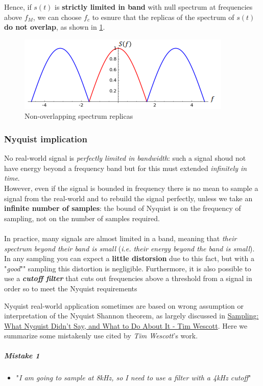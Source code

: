 \documentclass[10pt,a4paper]{report}
\theoremstyle{definition}
\begin{document}
Hence, if $s(t)$ is \textbf{strictly limited in band} with null spectrum at frequencies above $f_{M}$, we can choose $f_{c}$ to esnure that the replicas of the spectrum of $s(t)$ \textbf{do not overlap}, as shown in \ref{non-overlap-spectrum}.
\begin{figure}[h!]
	\centering\includegraphics[scale=0.50]{images/Pasted image 20230526120312.png}
	\caption{Non-overlapping spectrum replicas}
	\label{non-overlap-spectrum}
\end{figure}

\subsubsection{Nyquist implication}\label{sec:nyquist-implication}
No real-world signal is \textit{perfectly limited in bandwidth}: such a signal shoud not have energy beyond a frequency band but for this must extended \textit{infinitely in time}.\\
However, even if the signal is bounded in frequency there is no mean to sample a signal from the real-world and to rebuild the signal perfectly, unless we take an \textbf{infinite number of samples}: the bound of Nyquist is on the frequency of sampling, not on the number of samples required.\\\\
In practice, many signals are almost limited in a band, meaning that \textit{their spectrum beyond their band is small} (\textit{i.e. their energy beyond the band is small}).
In any sampling you can expect a \textbf{little distorsion} due to this fact,  but with a "\textit{good}"" sampling this distortion is negligible.
Furthermore, it is also possible to use a \textit{\textbf{cutoff filter}} that cuts out frequencies above a threshold from a signal in order so to meet the Nyquist requirements

Nyquist real-world application sometimes are based on wrong assumption or interpretation of the Nyquist Shannon theorem, as largely discussed in \href{https://neuron.eng.wayne.edu/auth/ece4330/practical_sampling.pdf}{Sampling: What Nyquist Didn’t Say, and What to Do About It -  Tim Wescott}.
Here we summarize some mistakenly use cited by \textit{Tim Wescott}'s work.
\subparagraph{Mistake 1}\label{sec:mistake-1}
\begin{itemize}
	\item "\textit{I am going to sample at 8kHz, so I need to use a filter with a 4kHz cutoff}"
\end{itemize}
\end{document}
